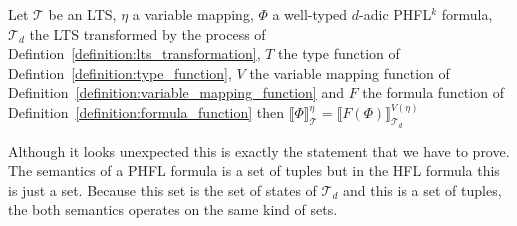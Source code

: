 \begin{lemma}
    \label{lemma:model_check_phfl_k}
    Let $\mathcal{T}$ be an LTS, $\eta$ a variable mapping, $\Phi$ a well-typed $d$-adic
    PHFL$^k$ formula, $\mathcal{T}_d$ the LTS transformed by the process of
    Defintion~\ref{definition:lts_transformation}, $T$ the type function of Defintion~\ref{definition:type_function},
    $V$ the variable mapping function of Definition~\ref{definition:variable_mapping_function}
    and $F$ the formula function of Definition~\ref{definition:formula_function} then $\llbracket \Phi \rrbracket^\eta_\mathcal{T} = \llbracket F(\Phi)
    \rrbracket^{V(\eta)}_{\mathcal{T}_d}$
\end{lemma}
Although it looks unexpected this is exactly the statement that we have to prove. The semantics of a PHFL formula is a set of tuples but in the HFL formula this is just a set. Because this set is the set of states of $\mathcal{T}_d$ and this is a set of tuples, the both semantics operates on the same kind of sets.
